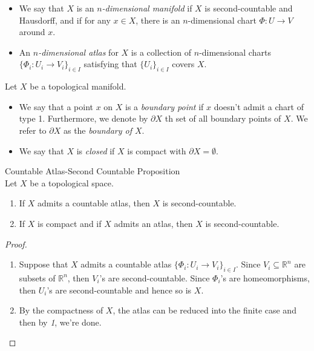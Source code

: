 \begin{definition}
\begin{itemize}
        \item We say that $X$ is an \textit{$n$-dimensional manifold} if $X$ is second-countable and Hausdorff, and if for any $x \in X$, there is an $n$-dimensional chart $\Phi : U \to V$ around $x$.

        \item An \textit{$n$-dimensional atlas} for $X$ is a collection of $n$-dimensional charts $\{ \Phi_i : U_i \to V_i\}_{i \in I}$ satisfying that $\{U_{i}\}_{i \in I}$ covers $X$.
    \end{itemize}
    \noindent Let $X$ be a topological manifold.
    \begin{itemize}
        \item We say that a point $x$ on $X$ is a \textit{boundary point} if $x$ doesn't admit a chart of type 1. Furthermore, we denote by $\partial X$ th set of all boundary points of $X$. We refer to $\partial X$ as the \textit{boundary of $X$}.

        \item We say that $X$ is \textit{closed} if $X$ is compact with $\partial X=\emptyset$.
    \end{itemize}
\end{definition}

\begin{proposition}{Countable Atlas-Second Countable Proposition}\\
Let $X$ be a topological space.
\begin{enumerate}
    \item If $X$ admits a countable atlas, then $X$ is second-countable.
    \item If $X$ is compact and if $X$ admits an atlas, then $X$ is second-countable.
\end{enumerate}
\end{proposition}

\begin{proof}
    \begin{enumerate}
        \item Suppose that $X$ admits a countable atlas $\{ \Phi_i :U_i \to V_i\}_{i \in I}$. Since $V_i \subseteq \mathbb{R}^n$ are subsets of $\mathbb{R}^n$, then $V_i$'s are second-countable. Since $\Phi_i$'s are homeomorphisms, then $U_i$'s are second-countable and hence so is $X$.

        \item By the compactness of $X$, the atlas can be reduced into the finite case and then by \textit{1}, we're done.
    \end{enumerate}
\end{proof}


